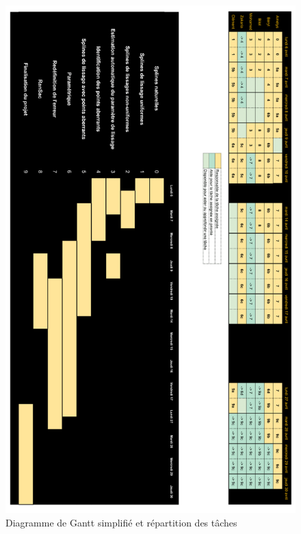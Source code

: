 \documentclass[a4paper,10pt]{article} %
\begin{document}
\begin{figure}
\begin{center}
\includegraphics[width=14cm]{p3.png} 
\end{center}
\caption{Diagramme de Gantt simplifié et répartition des tâches}
\label{DiagS}
\end{figure}
\end{document}
